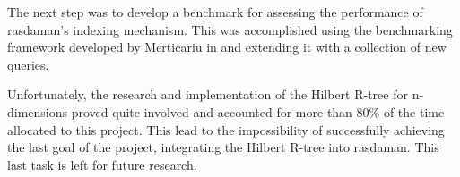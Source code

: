 \documentclass[11pt, a4paper, oneside]{article}
\begin{document}
The next step was to develop a benchmark for assessing the performance of rasdaman's indexing mechanism. This was accomplished using the benchmarking framework developed by Merticariu in \cite{GM} and extending it with a collection of new queries.

Unfortunately, the research and implementation of the Hilbert R-tree for n-dimensions proved quite involved and accounted for more than 80\% of the time allocated to this project. This lead to the impossibility of successfully achieving the last goal of the project, integrating the Hilbert R-tree into rasdaman. This last task is left for future research. 

\newpage

\newpage


\newpage
\end{document}
